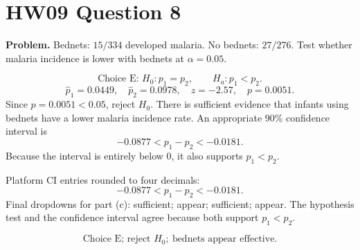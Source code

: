 \documentclass[11pt]{article}
\begin{document}
\section*{HW09 Question 8}

\textbf{Problem.} Bednets: \(15/334\) developed malaria. No bednets: \(27/276\). Test whether malaria incidence is lower with bednets at \(\alpha=0.05\).

\[
\boxed{\text{Choice E: }H_0:p_1=p_2,\qquad H_a:p_1<p_2.}
\]
\[
\hat p_1=0.0449,\quad \hat p_2=0.0978,\quad z=-2.57,\quad p=0.0051.
\]
Since \(p=0.0051<0.05\), reject \(H_0\). There is sufficient evidence that infants using bednets have a lower malaria incidence rate. An appropriate 90\% confidence interval is
\[
-0.0877<p_1-p_2<-0.0181.
\]
Because the interval is entirely below 0, it also supports \(p_1<p_2\).

Platform CI entries rounded to four decimals:
\[
-0.0877 < p_1-p_2 < -0.0181.
\]
Final dropdowns for part (c): sufficient; appear; sufficient; appear. The hypothesis test and the confidence interval agree because both support \(p_1<p_2\).

\[
\boxed{\text{Choice E; reject }H_0;\ \text{bednets appear effective.}}
\]
\end{document}
